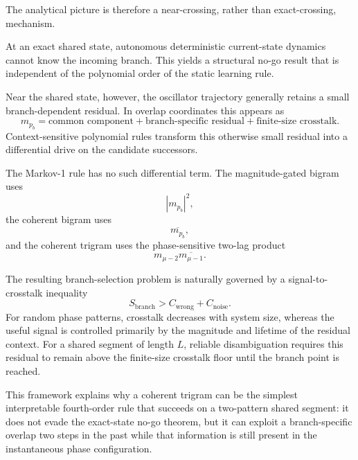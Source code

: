 The analytical picture is therefore a near-crossing, rather than
exact-crossing, mechanism.

At an exact shared state, autonomous deterministic current-state dynamics
cannot know the incoming branch.  This yields a structural no-go result that is
independent of the polynomial order of the static learning rule.

Near the shared state, however, the oscillator trajectory generally retains a
small branch-dependent residual.  In overlap coordinates this appears as
\begin{equation}
m_{p_b}
=
\text{common component}
+
\text{branch-specific residual}
+
\text{finite-size crosstalk}.
\end{equation}
Context-sensitive polynomial rules transform this otherwise small residual
into a differential drive on the candidate successors.

The Markov-1 rule has no such differential term.  The magnitude-gated bigram
uses
\begin{equation}
|m_{p_b}|^2,
\end{equation}
the coherent bigram uses
\begin{equation}
\overline{m_{p_b}},
\end{equation}
and the coherent trigram uses the phase-sensitive two-lag product
\begin{equation}
m_{\mu-2}\overline{m_{\mu-1}}.
\end{equation}

The resulting branch-selection problem is naturally governed by a
signal-to-crosstalk inequality
\begin{equation}
S_{\mathrm{branch}}
>
C_{\mathrm{wrong}}
+
C_{\mathrm{noise}}.
\end{equation}
For random phase patterns, crosstalk decreases with system size, whereas the
useful signal is controlled primarily by the magnitude and lifetime of the
residual context.  For a shared segment of length $L$, reliable disambiguation
requires this residual to remain above the finite-size crosstalk floor until
the branch point is reached.

This framework explains why a coherent trigram can be the simplest
interpretable fourth-order rule that succeeds on a two-pattern shared segment:
it does not evade the exact-state no-go theorem, but it can exploit a
branch-specific overlap two steps in the past while that information is still
present in the instantaneous phase configuration.

